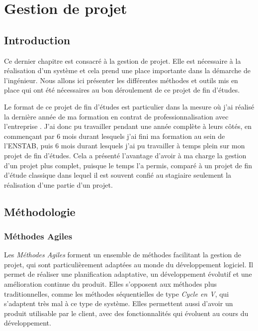 \chapter{Gestion de projet}
\label{chapter:projet}
	
	\section{Introduction}

		Ce dernier chapitre est consacré à la gestion de projet. Elle est nécessaire à la réalisation d'un système et cela prend une place importante dans la démarche de l'ingénieur. Nous allons ici présenter les différentes méthodes et outils mis en place qui ont été nécessaires au bon déroulement de ce projet de fin d'études.

		Le format de ce projet de fin d'études est particulier dans la mesure où j'ai réalisé la dernière année de ma formation en contrat de professionnalisation avec l'entreprise \forssea{}. J'ai donc pu travailler pendant une année complète à leurs côtés, en commençant par 6 mois durant lesquels j'ai fini ma formation au sein de l'\gls{ENSTAB}, puis 6 mois durant lesquels j'ai pu travailler à temps plein sur mon projet de fin d'études. Cela a présenté l'avantage d'avoir à ma charge la gestion d'un projet plus complet, puisque le temps l'a permis, comparé à un projet de fin d'étude classique dans lequel il est souvent confié au stagiaire seulement la réalisation d'une partie d'un projet.

	\section{Méthodologie}

		\subsection{Méthodes Agiles}
			Les \textit{Méthodes Agiles} forment un ensemble de méthodes facilitant la gestion de projet, qui sont particulièrement adaptées au monde du développement logiciel. Il permet de réaliser une planification adaptative, un développement évolutif et une amélioration continue du produit. Elles s'opposent aux méthodes plus traditionnelles, comme les méthodes séquentielles de type \textit{Cycle en V}, qui s'adaptent très mal à ce type de système. Elles permettent aussi d'avoir un produit utilisable par le client, avec des fonctionnalités qui évoluent au cours du développement.

